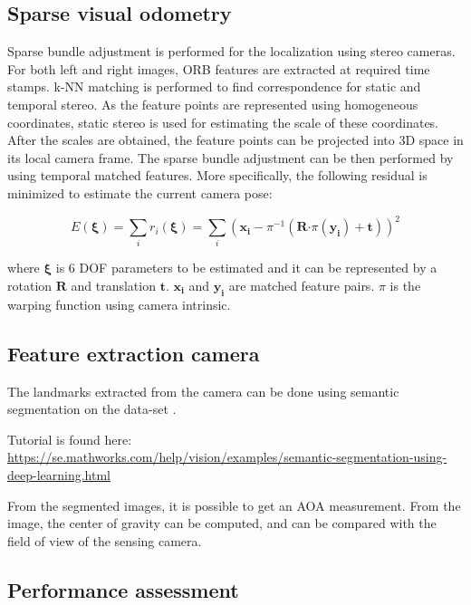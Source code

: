 \subsection{Sparse visual odometry}

Sparse bundle adjustment is performed for the localization using
stereo cameras. For both left and right images, \gls{ORB} features are
extracted at required time stamps. \gls{k-NN} matching
is performed to find correspondence for static and temporal stereo. As
the feature points are represented using homogeneous coordinates,
static stereo is used for estimating the scale of these
coordinates. After the scales are obtained, the feature points can be
projected into 3D space in its local camera frame. The sparse bundle
adjustment can be then performed by using temporal matched
features. More specifically, the following residual is minimized to
estimate the current camera pose:


\begin{equation} \label{eq:pnp}
  E (\bm{\xi}) = \sum_i r_i(\bm{\xi}) = \sum_i ( \bm{x_i} - \pi^{-1}( \mathbf{R} \mathbf{\cdot} \pi(\bm{y_i}) + \mathbf{t}))^2
\end{equation}

where $\bm{\xi}$ is 6 \gls{DOF} parameters to be estimated and it can be
represented by a rotation $\mathbf{R}$ and translation
$\mathbf{t}$. $\bm{x_i}$ and $\bm{y_i}$ are matched feature
pairs. $\pi$ is the warping function using camera intrinsic.

\subsection{Feature extraction camera}

The landmarks extracted from the camera can be done using semantic
segmentation on the data-set \cite{Brostow:2009:SOC:1464534.1465403}.

Tutorial is found here:
\url{https://se.mathworks.com/help/vision/examples/semantic-segmentation-using-deep-learning.html}

From the segmented images, it is possible to get an \gls{AOA}
measurement. From the image, the center of gravity can be computed,
and can be compared with the field of view of the sensing camera.

\subsection{Performance assessment}

